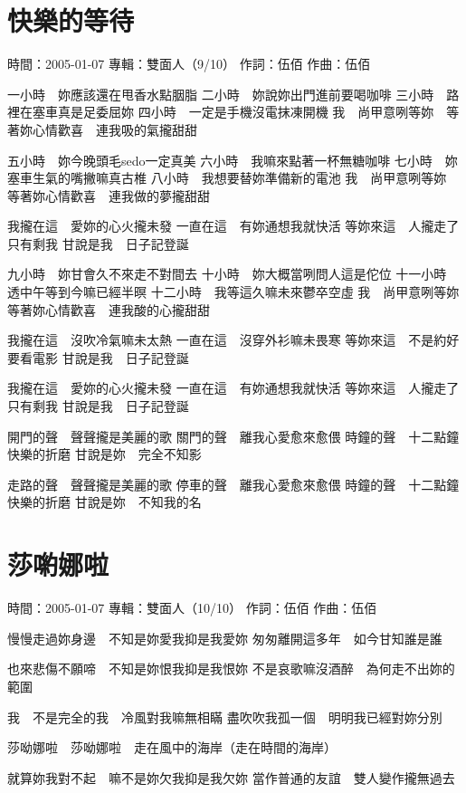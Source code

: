 \documentclass[UTF8,a4paper,oneside,twocolumn,12pt]{ctexbook}
\newcommand{\infopair}[2]{\textbullet #1：#2}
\newcommand{\zc}[1][伍佰]{\infopair{作詞}{#1}}
\newcommand{\zq}[1][伍佰]{\infopair{作曲}{#1}}
\newcommand{\zj}[1]{\infopair{專輯}{#1}}
\newcommand{\sj}[1]{\infopair{時間}{#1}}
\newenvironment{info}{\begin{flushleft}\kaishu
	}
	{\end{flushleft}\normalsize\yahei\par}
\newenvironment{lyric}{
	}
{}
\begin{document}
\section{快樂的等待}
\begin{info}
	\sj{2005-01-07}
	\zj{雙面人（9/10）}
	\zc
	\zq
\end{info}
\begin{lyric}
	一小時　妳應該還在甩香水點胭脂
	二小時　妳說妳出門進前要喝咖啡
	三小時　路裡在塞車真是足委屈妳
	四小時　一定是手機沒電抹凍開機
	我　尚甲意咧等妳　等著妳心情歡喜　連我吸的氣攏甜甜

	五小時　妳今晚頭毛sedo一定真美
	六小時　我嘛來點著一杯無糖咖啡
	七小時　妳塞車生氣的嘴撇嘛真古椎
	八小時　我想要替妳準備新的電池
	我　尚甲意咧等妳　等著妳心情歡喜　連我做的夢攏甜甜

	我攏在這　愛妳的心火攏未發
	一直在這　有妳通想我就快活
	等妳來這　人攏走了只有剩我
	甘說是我　日子記登誕

	九小時　妳甘會久不來走不對間去
	十小時　妳大概當咧問人這是佗位
	十一小時　透中午等到今嘛已經半暝
	十二小時　我等這久嘛未來鬱卒空虛
	我　尚甲意咧等妳　等著妳心情歡喜　連我酸的心攏甜甜

	我攏在這　沒吹冷氣嘛未太熱
	一直在這　沒穿外衫嘛未畏寒
	等妳來這　不是約好要看電影
	甘說是我　日子記登誕

	我攏在這　愛妳的心火攏未發
	一直在這　有妳通想我就快活
	等妳來這　人攏走了只有剩我
	甘說是我　日子記登誕

	開門的聲　聲聲攏是美麗的歌
	關門的聲　離我心愛愈來愈偎
	時鐘的聲　十二點鐘快樂的折磨
	甘說是妳　完全不知影

	走路的聲　聲聲攏是美麗的歌
	停車的聲　離我心愛愈來愈偎
	時鐘的聲　十二點鐘快樂的折磨
	甘說是妳　不知我的名
\end{lyric}

\section{莎喲娜啦}
\begin{info}
	\sj{2005-01-07}
	\zj{雙面人（10/10）}
	\zc
	\zq
\end{info}
\begin{lyric}
	慢慢走過妳身邊　不知是妳愛我抑是我愛妳
	匆匆離開這多年　如今甘知誰是誰

	也來悲傷不願啼　不知是妳恨我抑是我恨妳
	不是哀歌嘛沒酒醉　為何走不出妳的範圍

	我　不是完全的我　冷風對我嘛無相瞞
	盡吹吹我孤一個　明明我已經對妳分別

	莎呦娜啦　莎呦娜啦　走在風中的海岸（走在時間的海岸）

	就算妳我對不起　嘛不是妳欠我抑是我欠妳
	當作普通的友誼　雙人變作攏無過去
\end{lyric}
\end{document}
